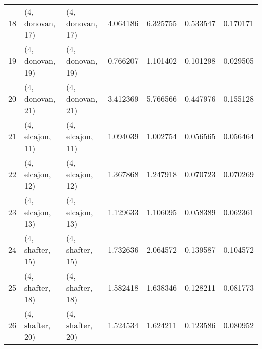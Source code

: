 \begin{tabular}{lllrrrr}
18 &  (4, donovan, 17) &  (4, donovan, 17) &  4.064186 &  6.325755 &   0.533547 &  0.170171 \\
19 &  (4, donovan, 19) &  (4, donovan, 19) &  0.766207 &  1.101402 &   0.101298 &  0.029505 \\
20 &  (4, donovan, 21) &  (4, donovan, 21) &  3.412369 &  5.766566 &   0.447976 &  0.155128 \\
21 &  (4, elcajon, 11) &  (4, elcajon, 11) &  1.094039 &  1.002754 &   0.056565 &  0.056464 \\
22 &  (4, elcajon, 12) &  (4, elcajon, 12) &  1.367868 &  1.247918 &   0.070723 &  0.070269 \\
23 &  (4, elcajon, 13) &  (4, elcajon, 13) &  1.129633 &  1.106095 &   0.058389 &  0.062361 \\
24 &  (4, shafter, 15) &  (4, shafter, 15) &  1.732636 &  2.064572 &   0.139587 &  0.104572 \\
25 &  (4, shafter, 18) &  (4, shafter, 18) &  1.582418 &  1.638346 &   0.128211 &  0.081773 \\
26 &  (4, shafter, 20) &  (4, shafter, 20) &  1.524534 &  1.624211 &   0.123586 &  0.080952 \\
\bottomrule
\end{tabular}
